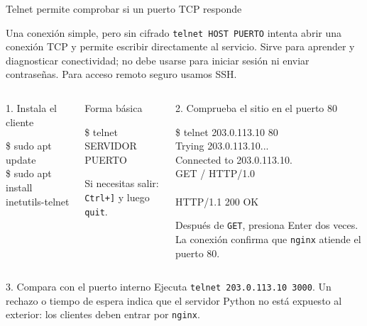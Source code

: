 \documentclass[aspectratio=169,10pt,c]{beamer}
\begin{document}
\begin{frame}{Telnet permite comprobar si un puerto TCP responde}
\begin{block}{Una conexión simple, pero sin cifrado}
\small \texttt{telnet HOST PUERTO} intenta abrir una conexión TCP y permite escribir directamente al servicio. Sirve para aprender y diagnosticar conectividad; no debe usarse para iniciar sesión ni enviar contraseñas. Para acceso remoto seguro usamos SSH.
\end{block}
\begin{columns}[T,onlytextwidth]
\begin{exampleblock}{1. Instala el cliente}
\begin{terminal}\footnotesize
\$ sudo apt update\\
\$ sudo apt install inetutils-telnet
\end{terminal}
\end{exampleblock}
\begin{exampleblock}{Forma básica}
\begin{terminal}\footnotesize
\$ telnet SERVIDOR PUERTO
\end{terminal}
\footnotesize Si necesitas salir: \texttt{Ctrl+]} y luego \texttt{quit}.
\end{exampleblock}
\begin{exampleblock}{2. Comprueba el sitio en el puerto 80}
\begin{terminal}\scriptsize
\$ telnet 203.0.113.10 80\\
Trying 203.0.113.10...\\
Connected to 203.0.113.10.\\
GET / HTTP/1.0\\
[presiona Enter otra vez]\\
HTTP/1.1 200 OK
\end{terminal}
\footnotesize Después de \texttt{GET}, presiona Enter dos veces. La conexión confirma que \texttt{nginx} atiende el puerto 80.
\end{exampleblock}
\end{columns}
\begin{alertblock}{3. Compara con el puerto interno}
\footnotesize Ejecuta \texttt{telnet 203.0.113.10 3000}. Un rechazo o tiempo de espera indica que el servidor Python no está expuesto al exterior: los clientes deben entrar por \texttt{nginx}.
\end{alertblock}
\end{frame}
\end{document}
